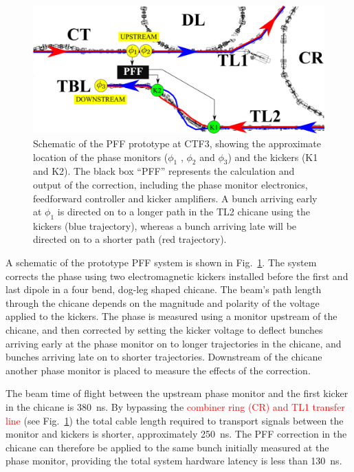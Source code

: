 \documentclass[%
 reprint,
superscriptaddress,
 amsmath,amssymb,
 prl,
]{revtex4-1}
\begin{document}

\begin{figure}
	\includegraphics[width=\textwidth]{figs/ctfpffLayout}%
	\caption{\label{fig:pffLayout}Schematic of the PFF prototype at CTF3, 
	showing the approximate location of the phase monitors (\(\phi_1\) , 
	\(\phi_2\) and \(\phi_3\)) and
		the kickers (K1 and K2). The black box “PFF” represents the calculation 
		and output of the correction, including the phase monitor
		electronics, feedforward controller and kicker amplifiers. A bunch 
		arriving early at \(\phi_1\) is directed on to a longer path in the TL2 
		chicane
		using the kickers (blue trajectory), whereas a bunch arriving late will 
		be directed on to a shorter path (red trajectory). }
\end{figure}

A schematic of the prototype PFF system is shown in Fig.~\ref{fig:pffLayout}. 
The system corrects the phase using two electromagnetic kickers installed 
before the first and last dipole in a four bend, dog-leg shaped chicane. The 
beam's path length through the chicane depends on the magnitude and polarity of 
the voltage applied to the kickers. The phase is measured using a monitor 
upstream of the chicane, and then corrected by setting the kicker voltage to 
deflect bunches arriving early at the phase monitor on to longer trajectories 
in the chicane, and bunches arriving late on to shorter trajectories. 
Downstream of the chicane another phase monitor is placed to measure the 
effects of the correction.

The beam time of flight between the upstream phase monitor and the first kicker 
in the chicane is 380~ns. By bypassing the \textcolor{red}{combiner ring (CR) 
and TL1 transfer 
line} (see Fig.~\ref{fig:pffLayout}) the total cable length required to 
transport signals between the monitor and kickers is shorter, approximately 
250~ns. The PFF correction in the chicane can therefore be applied to the same 
bunch initially measured at the phase monitor, providing the total system 
hardware latency is less than 130~ns. 
\end{document}

